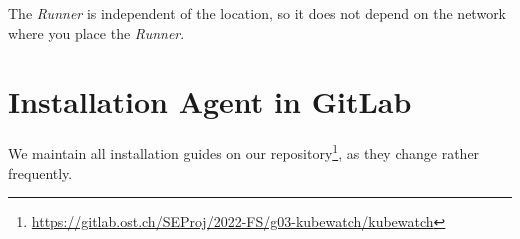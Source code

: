 The \textit{Runner} is independent of the location, so it does not depend on the network where you place the \textit{Runner}.

\section{Installation Agent in GitLab}
We maintain all installation guides on our repository\footnote{\url{https://gitlab.ost.ch/SEProj/2022-FS/g03-kubewatch/kubewatch}}, as they change rather frequently.

